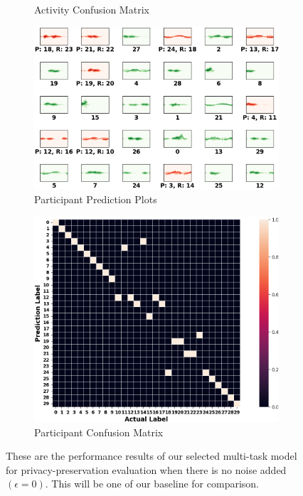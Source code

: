 \documentclass{l4proj}
\begin{document}
\begin{appendices}
\begin{figure}[h]
\begin{subfigure}{0.45\textwidth}
        \caption{Activity Confusion Matrix}
        \label{fig:privacy-preservation-basecase-activity-confusion-matrix}
    \end{subfigure}
    \begin{subfigure}{0.45\textwidth}
        \includegraphics[width=\textwidth]{images/privacy-preservation-basecase-participant-prediction-plots.png}
        \caption{Participant Prediction Plots}
        \label{fig:privacy-preservation-basecase-participant-prediction-plots}
    \end{subfigure}
    \qquad
    \begin{subfigure}{0.45\textwidth}
        \includegraphics[width=\textwidth]{images/privacy-preservation-basecase-participant-confusion-matrix.png}
        \caption{Participant Confusion Matrix}
        \label{fig:privacy-preservation-basecase-participant-confusion-matrix}
    \end{subfigure}
    \caption{These are the performance results of our selected multi-task model for privacy-preservation evaluation when there is no noise added $(\epsilon=0)$. This will be one of our baseline for comparison.}
    \label{fig:privacy-preservation-basecase-result-evaluation}
\end{figure}


\end{appendices}
\end{document}

